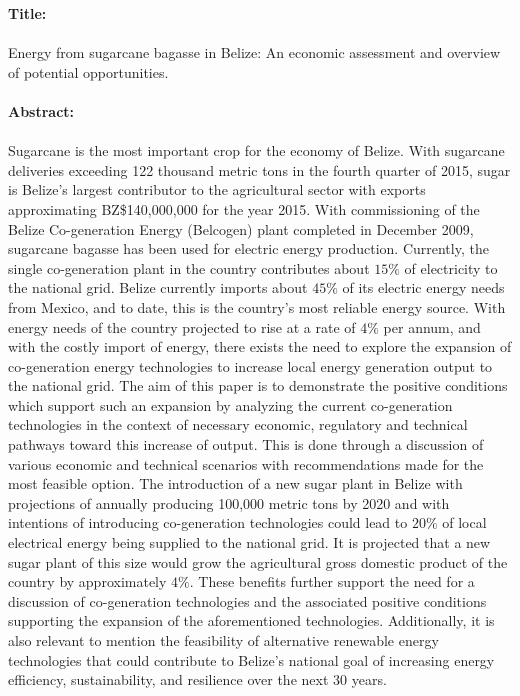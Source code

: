 \documentclass[12pt]{article}
\begin{document}
\noindent
\textbf{Title:} \\
\\Energy from sugarcane bagasse in Belize: An economic assessment and overview of potential opportunities. \\ \\
\noindent\textbf{Abstract:}\\
\\Sugarcane is the most important crop for the economy of Belize. With sugarcane deliveries exceeding 122 thousand metric tons in the fourth quarter of 2015, sugar is Belize's largest contributor to the agricultural sector with exports approximating BZ\$140,000,000 for the year 2015. With commissioning of the Belize Co-generation Energy (Belcogen) plant completed in December 2009, sugarcane bagasse has been used for electric energy production. Currently, the single co-generation plant in the country contributes about $15\%$ of electricity to the national grid. Belize currently imports about $45\%$ of its electric energy needs from Mexico, and to date, this is the country's most reliable energy source. With energy needs of the country projected to rise at a rate of $4\%$ per annum, and with the costly import of energy, there exists the need to explore the expansion of co-generation energy technologies to increase local energy generation output to the national grid. The aim of this paper is to demonstrate the positive conditions which support such an expansion by analyzing the current co-generation technologies in the context of necessary economic, regulatory and technical pathways toward this increase of output. This is done through a discussion of various economic and technical scenarios with recommendations made for the most feasible option. The introduction of a new sugar plant in Belize with projections of annually producing 100,000 metric tons by 2020 and with intentions of introducing co-generation technologies could lead to $20\%$ of local electrical energy being supplied to the national grid. It is projected that a new sugar plant of this size would grow the agricultural gross domestic product of the country by approximately $4\%$. These benefits further support the need for a discussion of co-generation technologies and the associated positive conditions supporting the expansion of the aforementioned technologies. Additionally, it is also relevant to mention the feasibility of alternative renewable energy technologies that could contribute to Belize's national goal of increasing energy efficiency, sustainability, and resilience over the next 30 years. 
\end{document}

